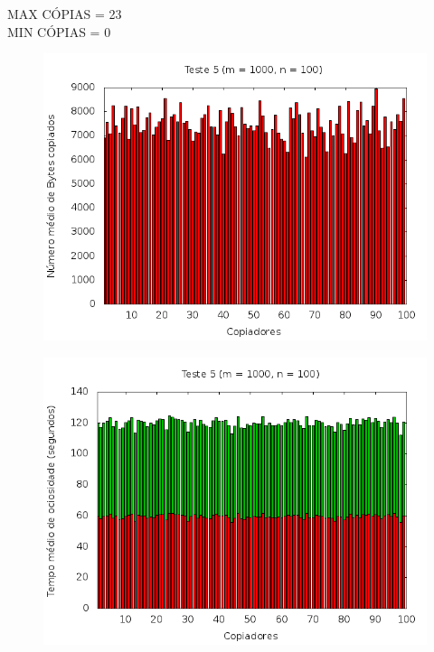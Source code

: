 \documentclass[12pt,a4paper]{article}
\begin{document}
MAX CÓPIAS = 23
\\
MIN CÓPIAS = 0

\begin{center}
\begin{figure}[H]
    \center
    \includegraphics[scale=0.5]{imagens/grafico_bytes5.png}
    \label{teste5_bytes}
\end{figure}
\end{center}

\begin{center}
\begin{figure}[H]
    \center
    \includegraphics[scale=0.5]{imagens/grafico_ociosidade5.png}
    \label{teste5_ociosidade}
\end{figure}
\end{center}
\end{document}
